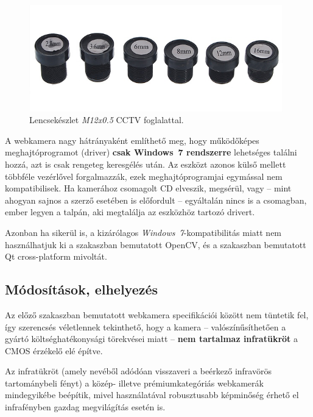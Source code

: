 \begin{figure}[!ht]
\centering
\includegraphics[width=110mm, keepaspectratio]{figures/lenses.png}
\caption{Lencsekészlet \emph{M12x0.5} CCTV foglalattal.}
\label{fig:lenses}
\end{figure}

A webkamera nagy hátrányaként említhető meg, hogy működőképes meghajtóprogramot (driver) \textbf{csak Windows~7 rendszerre} lehetséges találni hozzá, azt is csak rengeteg keresgélés után. Az eszközt azonos külső mellett többféle vezérlővel forgalmazzák, ezek meghajtóprogramjai egymással nem kompatibilisek. Ha kamerához csomagolt CD elveszik, megsérül, vagy -- mint ahogyan sajnos a szerző esetében is előfordult -- egyáltalán nincs is a csomagban, ember legyen a talpán, aki megtalálja az eszközhöz tartozó drivert.

Azonban ha sikerül is, a kizárólagos \emph{Windows~7}-kompatibilitás miatt nem használhatjuk ki a  szakaszban bemutatott OpenCV, és a  szakaszban bemutatott Qt cross-platform mivoltát.

\subsection{Módosítások, elhelyezés}\label{sect:infracam_mod}

Az előző szakaszban bemutatott webkamera specifikációi között nem tüntetik fel, így szerencsés véletlennek tekinthető, hogy a kamera -- valószínűsíthetően a gyártó költséghatékonysági törekvései miatt -- \textbf{nem tartalmaz infratükröt} a CMOS érzékelő elé építve.

Az infratükröt (amely nevéből adódóan visszaveri a beérkező infravörös tartománybeli fényt) a közép- illetve prémiumkategóriás webkamerák mindegyikébe beépítik, mivel használatával robusztusabb képminőség érhető el infrafényben gazdag megvilágítás esetén is.


